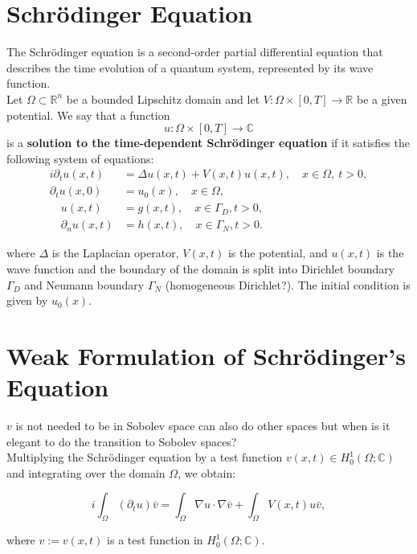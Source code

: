 \documentclass{article}
\theoremstyle{definition}
\theoremstyle{plain}
\theoremstyle{remark}
\begin{document}
\section{Schrödinger Equation}
The Schrödinger equation is a second-order partial differential equation that describes the time evolution of a quantum system, represented by its wave function. \\
Let $\Omega \subset \mathbb{R}^n$ be a bounded Lipschitz domain and let $V : \Omega \times [0,T] \to \mathbb{R}$ be a given potential. We say that a function
\[
u : \Omega \times [0,T] \to \mathbb{C}
\]
is a \textbf{solution to the time-dependent Schrödinger equation} if it satisfies the following system of equations:
\begin{align}
    i \partial_t u(x,t) &= \Delta u(x,t) + V(x,t) u(x,t), \quad x \in \Omega, \ t > 0,\\
    \partial_t u(x,0) &= u_0(x), \quad x \in \Omega,\\
    \quad u(x,t) &= g(x,t), \quad x \in \Gamma_D, t>0,\\
    \quad \partial_n u(x,t) &= h(x,t), \quad x \in \Gamma_N, t> 0.
\end{align}


where $\Delta$ is the Laplacian operator, $V(x,t)$ is the potential, and $u(x,t)$ is the wave function and the boundary of the domain is split into Dirichlet boundary $\Gamma_D$ and Neumann boundary $\Gamma_N$ (homogeneous Dirichlet?). 
The initial condition is given by $u_0(x)$.

\section{Weak Formulation of Schrödinger's Equation}
$v$ is not needed to be in Sobolev space can also do other spaces but when is it elegant to do the transition to Sobolev spaces? \\
Multiplying the Schrödinger equation by a test function $v(x,t) \in H_0^1(\Omega; \mathbb{C})$ and integrating over the domain $\Omega$, we obtain:

\begin{equation}
    i \int_{\Omega} \left( \partial_t u \right) \bar{v} = \int_{\Omega} \nabla u \cdot \nabla \bar{v} + \int_{\Omega} V(x,t) u \bar{v},
\end{equation}

where $v := v(x,t)$ is a test function in $H_0^1(\Omega; \mathbb{C})$.
\end{document}
